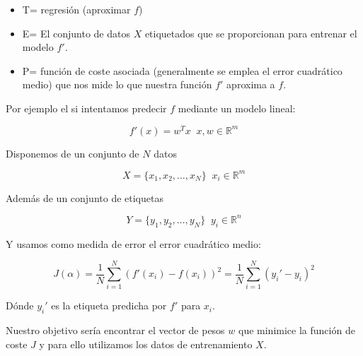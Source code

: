             \begin{itemize}
                \item T= regresión (aproximar $f$)
                \item E= El conjunto de datos $X$ etiquetados que se proporcionan para entrenar el modelo $f'$.
                \item P= función de coste asociada (generalmente se emplea el error cuadrático medio) que nos mide lo  que nuestra función $f'$ aproxima a $f$.
            \end{itemize}
            
            \medskip 

            \noindent Por ejemplo el si intentamos predecir $f$ mediante un modelo lineal: 

            \begin{equation}
                f'(x)= w^T x \; \; x,w \in \mathbb{R}^m
            \end{equation}

            \noindent Disponemos de un conjunto de $N$ datos 
            
            \begin{equation}
                X= \lbrace x_1, x_2 , \ldots , x_N \rbrace \; \; x_i \in \mathbb{R}^m
            \end{equation}

            \noindent Además de un conjunto de etiquetas

            \begin{equation}
                Y= \lbrace y_1, y_2 , \ldots , y_N \rbrace \; \; y_i \in \mathbb{R}^n
            \end{equation}

            \noindent Y usamos como medida de error el error cuadrático medio: 

            \begin{equation}
               J(\alpha)= \frac{1}{N} \sum_{i=1}^{N}(f'(x_i) - f(x_i))^2 = \frac{1}{N} \sum_{i=1}^{N}(y_i' - y_i)^2
            \end{equation}

            \noindent Dónde $y_i'$ es la etiqueta predicha por $f'$ para $x_i$.

            \medskip

            \noindent Nuestro objetivo sería encontrar el vector de pesos $w$ que minimice la función de coste $J$ y para ello utilizamos los datos de entrenamiento $X$.
            
